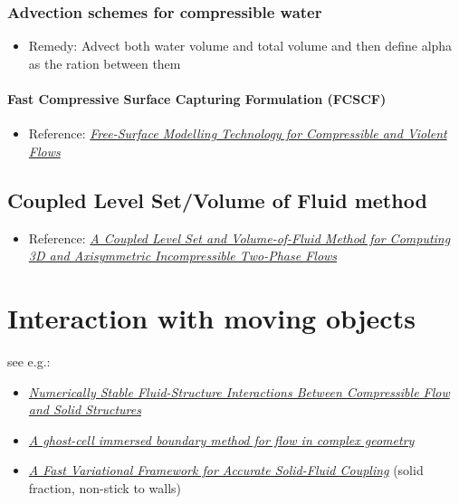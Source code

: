 \subsection{Advection schemes for compressible water}

\begin{itemize}
    \item Remedy: Advect both water volume and total volume and then define alpha as the ration between them
\end{itemize}

\subsubsection{Fast Compressive Surface Capturing Formulation (FCSCF)}

\begin{itemize}
    \item Reference: \textit{\href{http://researchspace.csir.co.za/dspace/bitstream/10204/5282/1/Heyns_2011.pdf}{Free-Surface Modelling Technology for Compressible and Violent Flows}}
\end{itemize}

\section{Coupled Level Set/Volume of Fluid  method}

\begin{itemize}
    \item Reference: \textit{\href{http://pages.csam.montclair.edu/~yecko/icodes/SussmanPuckett_LevelSetVOF.pdf}{A Coupled Level Set and Volume-of-Fluid Method for Computing 3D and Axisymmetric Incompressible Two-Phase Flows}}
\end{itemize}

\chapter{Interaction with moving objects}

see e.g.:

\begin{itemize}
    \item \textit{\href{http://physbam.stanford.edu/~fedkiw/papers/stanford2010-04.pdf}{Numerically Stable Fluid-Structure Interactions Between Compressible Flow and Solid Structures}}
    \item \textit{\href{http://efdl.as.ntu.edu.tw/research/papers/JCP03GCIBM.pdf}{A ghost-cell immersed boundary method for flow in complex geometry}}
    \item \textit{\href{http://www.cs.columbia.edu/~batty/papers/Batty07.pdf}{A Fast Variational Framework for Accurate Solid-Fluid Coupling}} (solid fraction, non-stick to walls)
\end{itemize}

